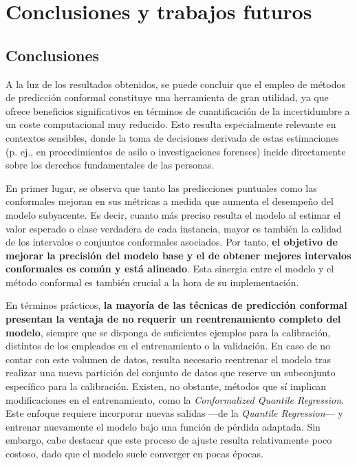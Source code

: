 \chapter{Conclusiones y trabajos futuros}

\section{Conclusiones}

A la luz de los resultados obtenidos, se puede concluir que el empleo de métodos de predicción conformal constituye una herramienta de gran utilidad, ya que ofrece beneficios significativos en términos de cuantificación de la incertidumbre a un coste computacional muy reducido. Esto resulta especialmente relevante en contextos sensibles, donde la toma de decisiones derivada de estas estimaciones (p. ej., en procedimientos de asilo o investigaciones forenses) incide directamente sobre los derechos fundamentales de las personas.


En primer lugar, se observa que tanto las predicciones puntuales como las conformales mejoran en sus métricas a medida que aumenta el desempeño del modelo subyacente. Es decir, cuanto más preciso resulta el modelo al estimar el valor esperado o clase verdadera de cada instancia, mayor es también la calidad de los intervalos o conjuntos conformales asociados. Por tanto, \textbf{el objetivo de mejorar la precisión del modelo base y el de obtener mejores intervalos conformales es común y está alineado}. Esta sinergia entre el modelo y el método conformal es también crucial a la hora de su implementación.

En términos prácticos, \textbf{la mayoría de las técnicas de predicción conformal presentan la ventaja de no requerir un reentrenamiento completo del modelo}, siempre que se disponga de suficientes ejemplos para la calibración, distintos de los empleados en el entrenamiento o la validación. En caso de no contar con este volumen de datos, resulta necesario reentrenar el modelo tras realizar una nueva partición del conjunto de datos que reserve un subconjunto específico para la calibración.
Existen, no obstante, métodos que sí implican modificaciones en el entrenamiento, como la \textit{Conformalized Quantile Regression}. Este enfoque requiere incorporar nuevas salidas ---de la \textit{Quantile Regression}--- y entrenar nuevamente el modelo bajo una función de pérdida adaptada. Sin embargo, cabe destacar que este proceso de ajuste resulta relativamente poco costoso, dado que el modelo suele converger en pocas épocas.


